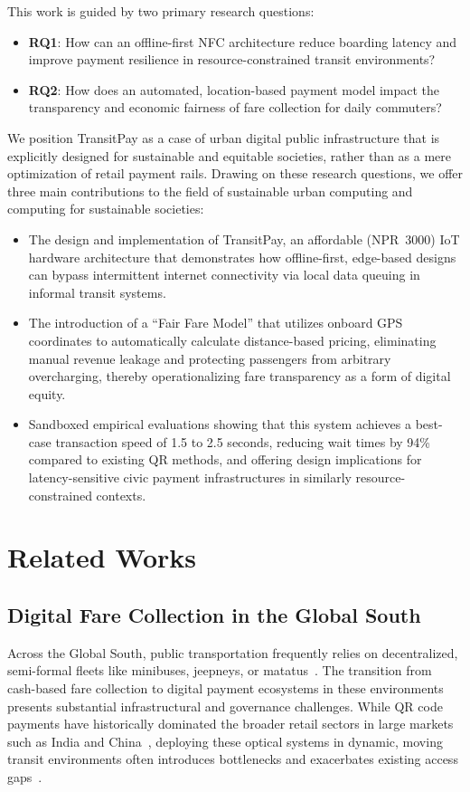 \documentclass[manuscript,review,anonymous]{acmart}
\begin{document}
This work is guided by two primary research questions:
\begin{itemize}
  \item \textbf{RQ1}: How can an offline-first NFC architecture reduce boarding latency and improve payment resilience in resource-constrained transit environments?

  \item \textbf{RQ2}: How does an automated, location-based payment model impact the transparency and economic fairness of fare collection for daily commuters?
\end{itemize}

We position TransitPay as a case of urban digital public infrastructure that is explicitly designed for sustainable and equitable societies, rather than as a mere optimization of retail payment rails. Drawing on these research questions, we offer three main contributions to the field of sustainable urban computing and computing for sustainable societies:

\begin{itemize}
  \item The design and implementation of TransitPay, an affordable (NPR~3000) IoT hardware architecture that demonstrates how offline-first, edge-based designs can bypass intermittent internet connectivity via local data queuing in informal transit systems.
  \item The introduction of a ``Fair Fare Model'' that utilizes onboard GPS coordinates to automatically calculate distance-based pricing, eliminating manual revenue leakage and protecting passengers from arbitrary overcharging, thereby operationalizing fare transparency as a form of digital equity.
  \item Sandboxed empirical evaluations showing that this system achieves a best-case transaction speed of 1.5 to 2.5 seconds, reducing wait times by 94\% compared to existing QR methods, and offering design implications for latency-sensitive civic payment infrastructures in similarly resource-constrained contexts.
\end{itemize}


\section{Related Works}

\subsection{Digital Fare Collection in the Global South}
Across the Global South, public transportation frequently relies on decentralized, semi-formal fleets like minibuses, jeepneys, or matatus~\cite{jica2017kathmandu_transport}. The transition from cash-based fare collection to digital payment ecosystems in these environments presents substantial infrastructural and governance challenges. While QR code payments have historically dominated the broader retail sectors in large markets such as India and China~\cite{de2023qr}, deploying these optical systems in dynamic, moving transit environments often introduces bottlenecks and exacerbates existing access gaps~\cite{de2023qr}.
\end{document}
